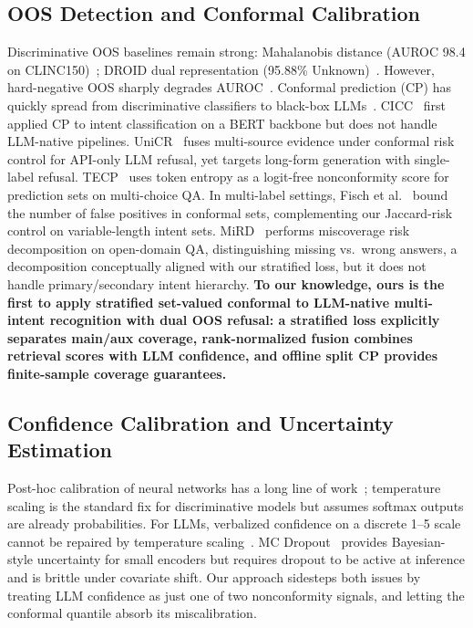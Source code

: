 \documentclass[sigconf, anonymous, review]{acmart}
\begin{document}
\subsection{OOS Detection and Conformal Calibration}
Discriminative OOS baselines remain strong: Mahalanobis distance (AUROC 98.4 on CLINC150)~\citep{maha}; DROID dual representation (95.88\% Unknown)~\citep{droid}. However, hard-negative OOS sharply degrades AUROC~\citep{hardneg}. Conformal prediction (CP) has quickly spread from discriminative classifiers to black-box LLMs~\citep{cpnlp,angelopoulos2021gentle}. CICC~\citep{cicc} first applied CP to intent classification on a BERT backbone but does not handle LLM-native pipelines. UniCR~\citep{unicr} fuses multi-source evidence under conformal risk control for API-only LLM refusal, yet targets long-form generation with single-label refusal. TECP~\citep{tecp} uses token entropy as a logit-free nonconformity score for prediction sets on multi-choice QA. In multi-label settings, Fisch et al.~\citep{fisch2022fp} bound the number of false positives in conformal sets, complementing our Jaccard-risk control on variable-length intent sets. MiRD~\citep{mird} performs miscoverage risk decomposition on open-domain QA, distinguishing missing vs.\ wrong answers, a decomposition conceptually aligned with our stratified loss, but it does not handle primary/secondary intent hierarchy. \textbf{To our knowledge, ours is the first to apply stratified set-valued conformal to LLM-native multi-intent recognition with dual OOS refusal: a stratified loss explicitly separates main/aux coverage, rank-normalized fusion combines retrieval scores with LLM confidence, and offline split CP provides finite-sample coverage guarantees.}

\subsection{Confidence Calibration and Uncertainty Estimation}
Post-hoc calibration of neural networks has a long line of work~\citep{guo2017calibration,mukhoti2020focal}; temperature scaling is the standard fix for discriminative models but assumes softmax outputs are already probabilities. For LLMs, verbalized confidence on a discrete 1--5 scale cannot be repaired by temperature scaling~\citep{jain2024calibrated,schuster2024conformal}. MC Dropout~\citep{gal2016dropout} provides Bayesian-style uncertainty for small encoders but requires dropout to be active at inference and is brittle under covariate shift. Our approach sidesteps both issues by treating LLM confidence as just one of two nonconformity signals, and letting the conformal quantile absorb its miscalibration.
\end{document}

